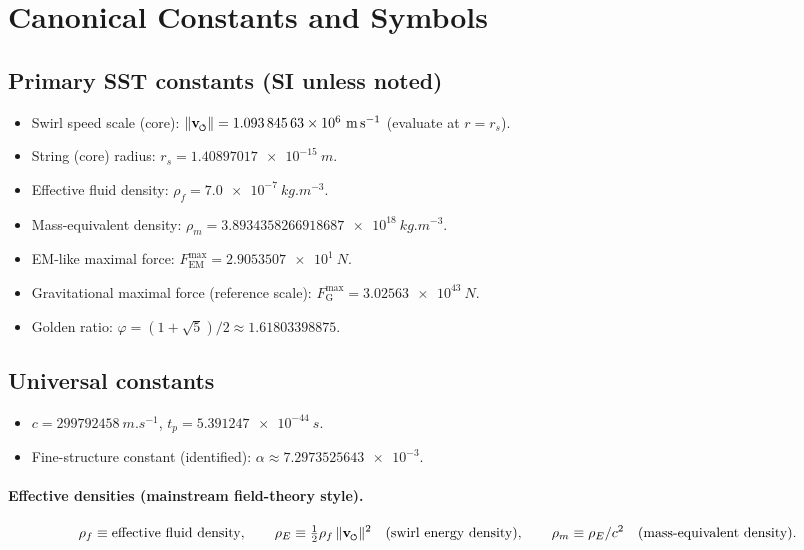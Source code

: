 \documentclass[11pt, a4paper]{article}
\newcommand{\swirlarrow}{%
    \mathchoice{\mkern-2mu\scriptstyle\boldsymbol{\circlearrowleft}}%
    {\mkern-2mu\scriptstyle\boldsymbol{\circlearrowleft}}%
    {\mkern-2mu\scriptscriptstyle\boldsymbol{\circlearrowleft}}%
    {\mkern-2mu\scriptscriptstyle\boldsymbol{\circlearrowleft}}%
}
\newcommand{\vswirl}{\mathbf{v}_{\swirlarrow}}
\newcommand{\vnorm}{\lVert \vswirl \rVert}               %
\newcommand{\rhof}{\rho_{\!f}}                           %
\newcommand{\rhom}{\rho_{\!m}}                           %
\newcommand{\rs}{r_s}                                    %
\newcommand{\FEMmax}{F_{\mathrm{EM}}^{\max}}             %
\newcommand{\FGmax}{F_{\mathrm{G}}^{\max}}               %
\begin{document}
    \section{Canonical Constants and Symbols}

    \subsection*{Primary SST constants (SI unless noted)}
    \begin{itemize}
        \item Swirl speed scale (core): $\vnorm = \num{1.09384563e6}\ \si{m.s^{-1}}$ (evaluate at $r=\rs$).
        \item String (core) radius: $\rs = \num{1.40897017e-15}\ \si{m}$.
        \item Effective fluid density: $\rhof = \num{7.0e-7}\ \si{kg.m^{-3}}$.
        \item Mass-equivalent density: $\rhom = \num{3.8934358266918687e18}\ \si{kg.m^{-3}}$. %
        \item EM-like maximal force: $\FEMmax = \num{2.9053507e1}\ \si{N}$.
        \item Gravitational maximal force (reference scale): $\FGmax = \num{3.02563e43}\ \si{N}$.
        \item Golden ratio: $\varphi = (1+\sqrt{5})/2 \approx \num{1.61803398875}$.
    \end{itemize}

    \subsection*{Universal constants}
    \begin{itemize}
        \item $c=\num{299792458}\ \si{m.s^{-1}}$, \quad $t_p=\num{5.391247e-44}\ \si{s}$.
        \item Fine-structure constant (identified): $\alpha \approx \num{7.2973525643e-3}$.
    \end{itemize}

    \paragraph{Effective densities (mainstream field-theory style).}
    \[
        \rho_f \equiv \text{effective fluid density},\qquad
        \rho_E \equiv \tfrac12 \rho_f\, \vnorm^2\quad(\text{swirl energy density}),\qquad
        \rho_m \equiv \rho_E/c^2\quad(\text{mass-equivalent density}).
    \]
\end{document}
